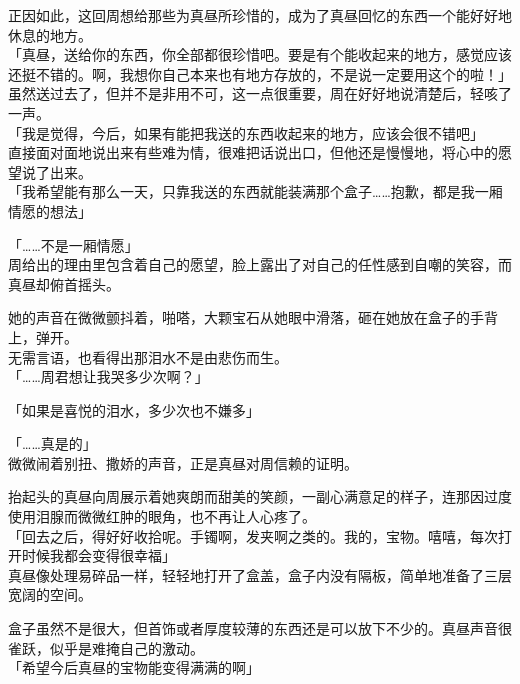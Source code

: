 正因如此，这回周想给那些为真昼所珍惜的，成为了真昼回忆的东西一个能好好地休息的地方。\\

「真昼，送给你的东西，你全部都很珍惜吧。要是有个能收起来的地方，感觉应该还挺不错的。啊，我想你自己本来也有地方存放的，不是说一定要用这个的啦！」\\

虽然送过去了，但并不是非用不可，这一点很重要，周在好好地说清楚后，轻咳了一声。\\

「我是觉得，今后，如果有能把我送的东西收起来的地方，应该会很不错吧」\\

直接面对面地说出来有些难为情，很难把话说出口，但他还是慢慢地，将心中的愿望说了出来。\\

「我希望能有那么一天，只靠我送的东西就能装满那个盒子……抱歉，都是我一厢情愿的想法」

「……不是一厢情愿」\\

周给出的理由里包含着自己的愿望，脸上露出了对自己的任性感到自嘲的笑容，而真昼却俯首摇头。

她的声音在微微颤抖着，啪嗒，大颗宝石从她眼中滑落，砸在她放在盒子的手背上，弹开。\\

无需言语，也看得出那泪水不是由悲伤而生。\\

「……周君想让我哭多少次啊？」

「如果是喜悦的泪水，多少次也不嫌多」

「……真是的」\\

微微闹着别扭、撒娇的声音，正是真昼对周信赖的证明。

抬起头的真昼向周展示着她爽朗而甜美的笑颜，一副心满意足的样子，连那因过度使用泪腺而微微红肿的眼角，也不再让人心疼了。\\

「回去之后，得好好收拾呢。手镯啊，发夹啊之类的。我的，宝物。嘻嘻，每次打开时候我都会变得很幸福」\\

真昼像处理易碎品一样，轻轻地打开了盒盖，盒子内没有隔板，简单地准备了三层宽阔的空间。

盒子虽然不是很大，但首饰或者厚度较薄的东西还是可以放下不少的。真昼声音很雀跃，似乎是难掩自己的激动。\\

「希望今后真昼的宝物能变得满满的啊」

